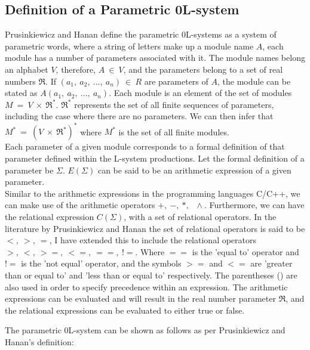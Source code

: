 \subsection{Definition of a Parametric 0L-system} \label{definition of a parametric 0L-system section}

\begin{flushleft}

Prusinkiewicz and Hanan define the parametric 0L-systems as a system of parametric words, where a string of letters make up a module name $A$, each module has a number of parameters associated with it. The module names belong an alphabet $V$, therefore, $A~ \in~ V$, and the parameters belong to a set of real numbers $\Re$. If $(a_1,~ a_2,~ ...,~ a_n)~ \in~ R$ are parameters of $A$, the module can be stated as $A(a_1,~ a_2,~ ...,~ a_n)$. Each module is an element of the set of modules $M~ =~ V~ \times~ \Re^*$. $\Re^*$ represents the set of all finite sequences of parameters, including the case where there are no parameters. We can then infer that $M^*~ =~ (V~ \times~ \Re^*)^*$ where $M^*$ is the set of all finite modules. \\
Each parameter of a given module corresponds to a formal definition of that parameter defined within the L-system productions. Let the formal definition of a parameter be $\Sigma$. $ E(\Sigma) $ can be said to be an arithmetic expression of a given parameter.\\ Similar to the arithmetic expressions in the programming languages C/C++, we can make use of the arithmetic operators $ +,~ -,~ *,~ \,~ \wedge{}$. Furthermore, we can have the relational expression $C(\Sigma)$, with a set of relational operators. In the literature by Prusinkiewicz and Hanan the set of relational operators is said to be $<,~ >,~ =$, I have extended this to include the relational operators $>,~ <,~ >=,~ <=,~ ==,~ !=$. Where $==$ is the 'equal to' operator and $!=$ is the 'not equal' operator, and the symbols $>=$ and $<=$ are 'greater than or equal to' and 'less than or equal to' respectively. The parentheses () are also used in order to specify precedence within an expression. The arithmetic expressions can be evaluated and will result in the real number parameter $\Re $, and the relational expressions can be evaluated to either true or false. \\

\vspace{5mm}

The parametric 0L-system can be shown as follows as per Prusinkiewicz and Hanan's definition:\\


\end{flushleft}

